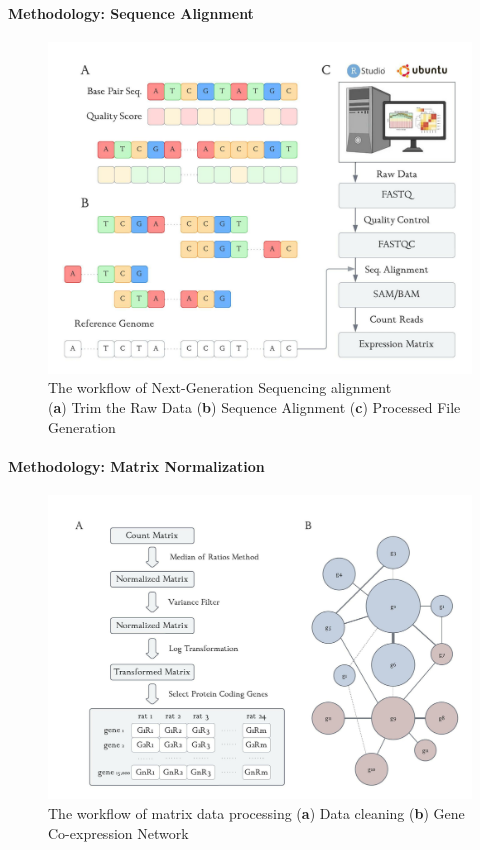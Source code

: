\documentclass[
11pt,notheorems,hyperref={pdfauthor=whatever}
]{beamer}
\begin{document}
\begin{frame}
    \framesubtitle{Methodology: Sequence Alignment}
    \vspace{-20px}
    \begin{figure}[h]
        \renewcommand{\figurename}{Figure 3}
        \includegraphics [scale=0.7] {AldoFruc_BioInfo.jpg} 
        \captionsetup{justification=centering}
        \caption{The workflow of Next-Generation Sequencing alignment \\ (\textbf{a}) Trim the Raw Data (\textbf{b}) Sequence Alignment (\textbf{c}) Processed File Generation}
    \end{figure}
\end{frame}

\begin{frame}
    \framesubtitle{Methodology: Matrix Normalization}
    \vspace{-20px}
    \begin{figure}[h]
        \renewcommand{\figurename}{Figure 4}
        \includegraphics [scale=0.68] {AldoFruc_DataProcess.jpg} 
        \captionsetup{justification=centering}
        \caption{The workflow of matrix data processing (\textbf{a}) Data cleaning (\textbf{b}) Gene Co-expression Network}
    \end{figure}
\end{frame}
\end{document}
